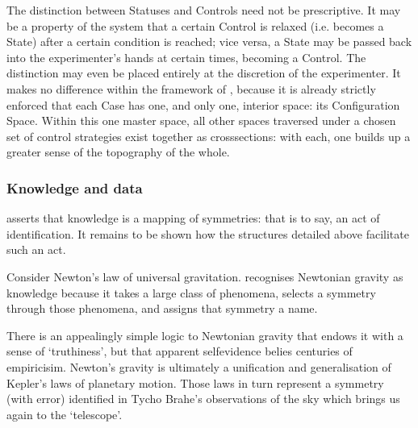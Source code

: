 \documentclass[letterpaper,10pt,english]{jupyterBook}
\begin{document}
\sphinxAtStartPar
The distinction between Statuses and Controls need not be prescriptive. It may be a property of the system that a certain Control is relaxed (i.e. becomes a State) after a certain condition is reached; vice versa, a State may be passed back into the experimenter’s hands at certain times, becoming a Control. The distinction may even be placed entirely at the discretion of the experimenter. It makes no difference within the framework of , because it is already strictly enforced that each Case has one, and only one, interior space: its Configuration Space. Within this one master space, all other spaces traversed under a chosen set of control strategies exist together as cross\sphinxhyphen{}sections: with each, one builds up a greater sense of the topography of the whole.


\subsubsection{Knowledge and data}
\label{\detokenize{content/chapter_03_everest/doctrine:knowledge-and-data}}
\sphinxAtStartPar
{} asserts that knowledge is a mapping of symmetries: that is to say, an act of identification. It remains to be shown how the structures detailed above facilitate such an act.

\sphinxAtStartPar
Consider Newton’s law of universal gravitation.  recognises Newtonian gravity as knowledge because it takes a large class of phenomena, selects a symmetry through those phenomena, and assigns that symmetry a name.

\sphinxAtStartPar
There is an appealingly simple logic to Newtonian gravity that endows it with a sense of ‘truthiness’, but that apparent self\sphinxhyphen{}evidence belies centuries of empiricisim. Newton’s gravity is ultimately a unification and generalisation of Kepler’s laws of planetary motion. Those laws in turn represent a symmetry (with error) identified in Tycho Brahe’s observations of the sky \sphinxhyphen{} which brings us again to the ‘telescope’.
\end{document}
